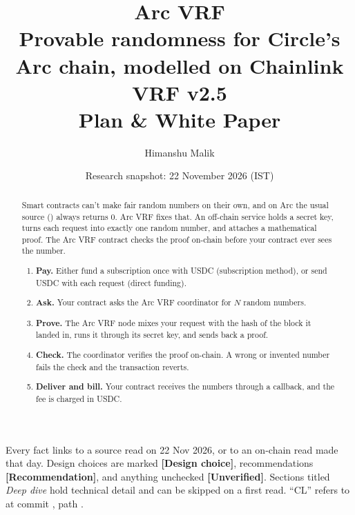 \documentclass[11pt,a4paper]{article}
\title{\textbf{Arc VRF}\\[4pt]\large Provable randomness for Circle's Arc chain, modelled on Chainlink VRF v2.5\\[2pt]\normalsize Plan \& White Paper}
\author{Himanshu Malik}
\date{Research snapshot: 22 November 2026 (IST)}
\begin{document}
\maketitle

\begin{abstract}
\noindent Smart contracts can't make fair random numbers on their own, and on Arc the usual source () always returns 0. Arc VRF fixes that. An off-chain service holds a secret key, turns each request into exactly one random number, and attaches a mathematical proof. The Arc VRF contract checks the proof on-chain before your contract ever sees the number.
\begin{enumerate}[label=\arabic*.,leftmargin=1.5em]
  \item \textbf{Pay.} Either fund a subscription once with USDC (subscription method), or send USDC with each request (direct funding).
  \item \textbf{Ask.} Your contract asks the Arc VRF coordinator for $N$ random numbers.
  \item \textbf{Prove.} The Arc VRF node mixes your request with the hash of the block it landed in, runs it through its secret key, and sends back a proof.
  \item \textbf{Check.} The coordinator verifies the proof on-chain. A wrong or invented number fails the check and the transaction reverts.
  \item \textbf{Deliver and bill.} Your contract receives the numbers through a callback, and the fee is charged in USDC.
\end{enumerate}
\end{abstract}

\noindent\small Every fact links to a source read on 22 Nov 2026, or to an on-chain read made that day. Design choices are marked \textbf{[Design choice]}, recommendations \textbf{[Recommendation]}, and anything unchecked \textbf{[Unverified]}. Sections titled \emph{Deep dive} hold technical detail and can be skipped on a first read. ``CL'' refers to  at commit , path  \cite{clcode}.\normalsize

\tableofcontents
\newpage

\end{document}
